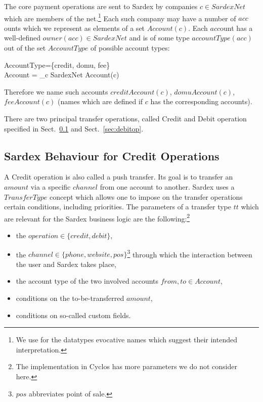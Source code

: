 The core payment operations are sent to Sardex by companies $c \in SardexNet$ which are members of the net.\footnote{We use for the datatypes evocative names which suggest their intended interpretation.} Each such company may have a number of $acc$ounts which we represent as elements of a set $Account(c)$. Each $acc$ount has a well-defined $owner(acc) \in SardexNet$ and is of some type $accountType(acc)$ out of the set $AccountType$ of possible account types:

\begin{asm}
AccountType=\{credit, domu, fee\} \\
Account = \bigcup_{c \in SardexNet} Account(c)
\end{asm}
Therefore we name such accounts $creditAccount(c)$, $domuAccount(c)$, $feeAccount(c)$ (names which are defined if $c$ has the corresponding accounts). 

There are two principal transfer operations, called Credit and Debit operation specified in Sect.~\ref{sec:creditop} and Sect.~\ref{sec:debitop}.

\subsection{Sardex Behaviour for Credit Operations}
\label{sec:creditop}

A Credit operation is also called a push transfer. Its goal is to transfer an $amount$ via a specific $channel$ from one account to another. Sardex uses a $TransferType$ concept which allows one to impose on the transfer operations certain conditions, including priorities. The parameters of a transfer type $tt$ which are relevant for the Sardex business logic are the following:\footnote{The implementation in Cyclos has more parameters we do not consider here.}

\begin{itemize}
	\item the $operation \in \{credit, debit\}$,
	\item the $channel \in \{phone,website,pos\}$\footnote{$pos$ abbreviates point of sale.} through which the interaction between the user and Sardex takes place,
	\item the account type of the two involved accounts $from,to \in Account$,
	\item conditions on the to-be-transferred $amount$, 
	\item conditions on so-called custom fields.
\end{itemize}

